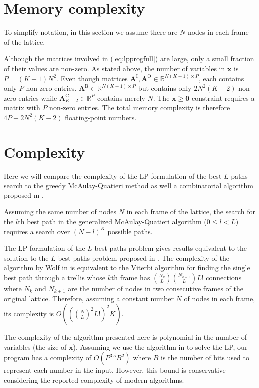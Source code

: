 \documentclass{article}
\newcommand{\BS}[1]{\boldsymbol{#1}}
\begin{document}
\begin{sloppy}
\section{Memory complexity}

To simplify notation, in this section we assume there are $N$ nodes in each
frame of the lattice.

Although the matrices involved in (\ref{eq:lpprogfull}) are large, only a small
fraction of their values are non-zero. As stated above, the number of variables in $\BS{x}$ is
$P = (K-1)N^{2}$. Even though matrices $\BS{A}^{\text{I}}, \BS{A}^{\text{O}} \in
\mathbb{R}^{N(K-1) \times P}$, each contains only $P$ non-zero
entries.  $\BS{A}^{\text{B}} \in \mathbb{R}^{N(K-1) \times P}$ but contains only
$2N^{2}(K-2)$ non-zero entries while $\BS{A}^{\text{C}}_{K-2} \in \mathbb{R}^{P}$
contains merely $N$. The $\BS{x} \geq \BS{0}$ constraint requires a matrix
with $P$ non-zero entries. The total memory complexity is therefore $4P +
2N^{2}(K-2)$ floating-point numbers.

\section{Complexity}

Here we will compare the complexity of the LP formulation of the best $L$ paths
search to the greedy McAulay-Quatieri method as well a combinatorial algorithm
proposed in \cite{wolf1989finding}.

Assuming the same number of nodes $N$ in each frame of the lattice, the 
search for the $l$th best path in the generalized McAulay-Quatieri
algorithm ($0 \leq l < L$) requires a search over $(N-l)^{K}$ possible paths.

The LP formulation of the $L$-best paths problem gives results equivalent to the
solution to the $L$-best paths problem proposed in \cite{wolf1989finding}. The
complexity of the algorithm by Wolf in \cite{wolf1989finding} is equivalent to
the Viterbi algorithm for finding the single best path through a trellis whose
$k$th frame has $\binom{N_{k}}{L}\binom{N_{k+1}}{L}L!$ connections where $N_{k}$
and $N_{k+1}$ are the number of nodes in two consecutive frames of the original
lattice. Therefore, assuming a constant number $N$ of nodes in each frame, its
complexity is $O((\binom{N}{L}^{2}L!)^{2}K)$.

The complexity of the algorithm presented here is polynomial in the number of
variables (the size of $\BS{x}$).  Assuming we use the algorithm in
\cite{karmarkar1984new} to solve the LP, our program has a complexity of
$O(P^{3.5}B^{2})$ where $B$ is the number of bits used to represent each number
in the input.  However, this bound is conservative considering the reported
complexity of modern algorithms.


\end{sloppy}
\end{document}

